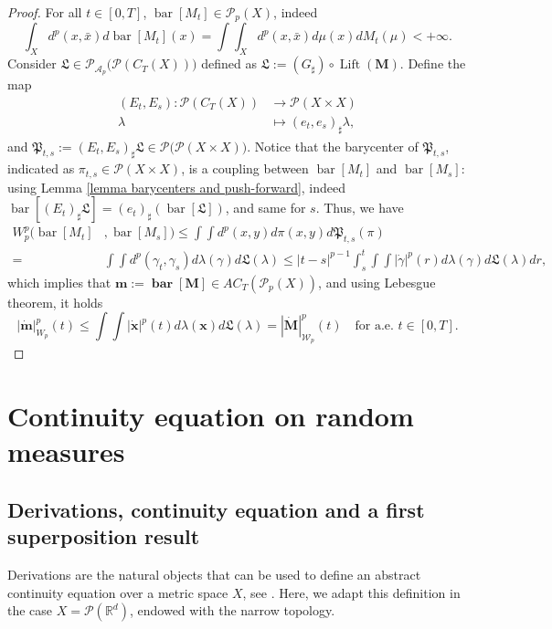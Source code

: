 \documentclass[10pt,leqno]{amsart}
\numberwithin{equation}{section}
\newcommand{\R}{\mathbb{R}}
\newcommand{\PP}{\mathcal{P}}
\begin{document}
\begin{proof}
    For all $t\in [0,T]$, $\operatorname{bar}[M_t]\in \PP_p(X)$, indeed
    \[\int_X  d^p(x,\bar{x}) d\operatorname{bar}[M_t](x) = \int \int_X d^p(x,\bar{x}) d\mu(x) dM_t(\mu) <+\infty. \]
    Consider $\mathfrak{L}\in \PP_{\mathcal{A}_p}\big(\PP(C_T(X))\big)$ defined as $\mathfrak{L}:= (G_\sharp )\circ \operatorname{Lift}(\boldsymbol{M})$. Define the map 
    \begin{align*}
        (E_t,E_s): \PP(C_T(X)) & \to \PP(X\times X)
        \\
        \lambda \ & \mapsto (e_t,e_s)_\sharp \lambda,
    \end{align*}
    and $\mathfrak{P}_{t,s}:= (E_t,E_s)_\sharp  \mathfrak{L} \in \PP\big(\PP(X\times X)\big)$. Notice that the barycenter of $\mathfrak{P}_{t,s}$, indicated as $\pi_{t,s}\in \PP(X\times X)$, is a coupling between $\operatorname{bar}[M_t]$ and $\operatorname{bar}[M_s]$: using Lemma \ref{lemma barycenters and push-forward}, indeed $\operatorname{bar}[(E_t)_\sharp  \mathfrak{L}] = (e_t)_\sharp (\operatorname{bar}[\mathfrak{L}])$, and same for $s$. Thus, we have
    \begin{align*}
        W_p^p(\operatorname{bar}[M_t] & ,\operatorname{bar}[M_s])
        \leq 
        \int \int d^p(x,y) d\pi(x,y) d\mathfrak{P}_{t,s}(\pi)
        \\
        = &
        \int \int d^p(\gamma_t,\gamma_s) d\lambda(\gamma) d\mathfrak{L}(\lambda)
        \leq 
        |t-s|^{p-1} \int_s^t \int \int |\dot\gamma|^p(r) d\lambda(\gamma) d\mathfrak{L}(\lambda) dr,
    \end{align*}
    which implies that $\boldsymbol{m}:=\boldsymbol{\operatorname{bar}[M]} \in AC_T(\PP_p(X))$, and using Lebesgue theorem, it holds 
    \begin{equation}
        | \dot{\boldsymbol{m}} |_{W_p}^p(t) \leq \int \int |\dot{\boldsymbol{x}}|^p(t) d\lambda(\boldsymbol{x}) d\mathfrak{L}(\lambda) = |\dot{\boldsymbol{M}}|_{\mathcal{W}_p}^p(t) \quad \text{for a.e. $t\in [0,T]$.}
    \end{equation}
\end{proof}
\section{Continuity equation on random measures}\label{CE: derivations vs VF}

\subsection{Derivations, continuity equation and a first superposition result}\label{subsec: first superposition result}
Derivations are the natural objects that can be used to define an abstract continuity equation over a metric space $X$, see \cite{stepanov2017three}. Here, we adapt this definition in the case $X= \PP(\R^d)$, endowed with the narrow topology.
\end{document}
